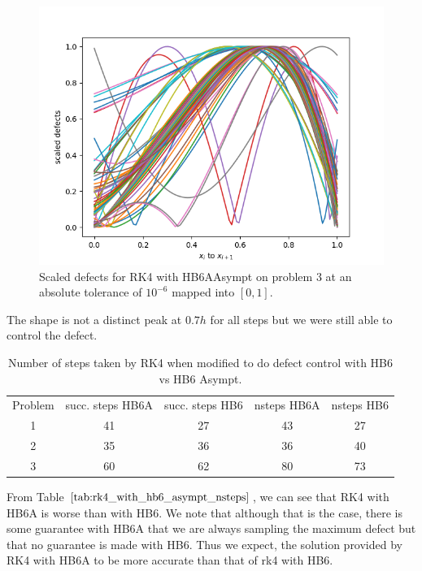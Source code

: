 \begin{figure}[H]
\centering
\includegraphics[width=0.7\linewidth]{./figures/rk4_with_hb6_asympt_p3_scaled_defects}
\caption{Scaled defects for RK4 with HB6AAsympt on problem 3 at an absolute tolerance of $10^{-6}$ mapped into $[0, 1]$.}
\label{fig:rk4_with_hb6_asympt_p3_scaled_defects}
\end{figure}

The shape is not a distinct peak at $0.7h$ for all steps but we were still able to control the defect.

\begin{table}[h]
\caption {Number of steps taken by RK4 when modified to do defect control with HB6 vs HB6 Asympt.} \label{tab:rk4_with_hb6_asympt_nsteps}
\begin{center}
\begin{tabular}{ c c c c c } 
Problem & succ. steps HB6A & succ. steps HB6 & nsteps HB6A  & nsteps HB6 \\ 
1       & 41               &        27       & 43           & 27 \\ 
2       & 35               &        36       & 36           & 40 \\
3       & 60               &        62       & 80           & 73 \\
\end{tabular}
\end{center}
\end{table}

From Table $\ref{tab:rk4_with_hb6_asympt_nsteps}$, we can see that RK4 with HB6A is worse than with HB6. We note that although that is the case, there is some guarantee with HB6A that we are always sampling the maximum defect but that no guarantee is made with HB6. Thus we expect, the solution provided by RK4 with HB6A to be more accurate than that of rk4 with HB6.